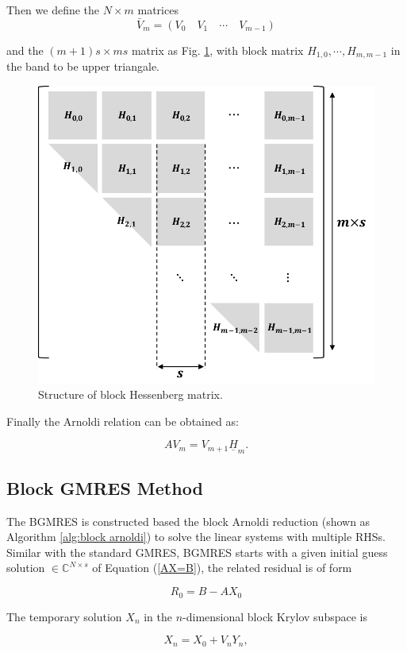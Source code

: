 Then we define the $N\times m$ matrices
\[\bar{V}_m = (V_0 \quad V_1  \quad \cdots  \quad V_{m-1})\]

and the $(m+1)s \times ms$ matrix as Fig. \ref{fig:block-hessemberg}, with block matrix $H_{1,0}, \cdots, H_{m,m-1}$ in the band to be upper triangale. 

\begin{figure}[htbp]
	\centering
	\includegraphics[width=0.6\linewidth]{fig/block-hessemberg.pdf}
	\caption{Structure of block Hessenberg matrix.}
	\label{fig:block-hessemberg}
\end{figure}

Finally the Arnoldi relation can be obtained as:

\begin{equation}
\label{blockarnoldi}
	AV_m= V_{m+1} \underline{H}_m.
\end{equation}

\subsection{Block GMRES Method}

The BGMRES is constructed based the block Arnoldi reduction (shown as Algorithm \ref{alg:block arnoldi}) to solve the linear systems with multiple RHSs. Similar with the standard GMRES, BGMRES starts with a given initial guess solution $\in \mathbb{C}^{N\times s}$ of Equation (\ref{AX=B}), the related residual is of form

\begin{equation}
	R_0=B-AX_0
\end{equation}

The temporary solution $X_n$ in the $n$-dimensional block Krylov subspace is

\begin{equation}
	X_n = X_0+V_nY_n,
\end{equation}

